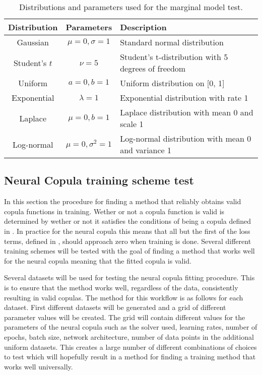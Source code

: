 \begin{table}[h]
    \centering
    \caption{Distributions and parameters used for the marginal model test.}
    \begin{tabular}{@{}ccl@{}}
        Distribution & Parameters & Description \\
        \toprule
        Gaussian & $\mu=0, \sigma=1$ & Standard normal distribution \\ 
        Student's $t$ & $\nu=5$ & Student's t-distribution with 5 degrees of freedom \\ 
        Uniform & $a=0, b=1$ & Uniform distribution on [0, 1] \\ 
        Exponential & $\lambda=1$ & Exponential distribution with rate 1 \\ 
        Laplace & $\mu=0, b=1$ & Laplace distribution with mean 0 and scale 1 \\ 
        Log-normal & $\mu=0, \sigma^2=1$ & Log-normal distribution with mean 0 and variance 1 \\ 
    \end{tabular}
    \label{tab:distributions}
\end{table}







\subsection{Neural Copula training scheme test}
In this section the procedure for finding a method that reliably obtains valid copula functions in training. Wether or not a copula function is valid is determined by wether or not it satisfies the conditions of being a copula defined in . In practice for the neural copula this means that all but the first of the loss terms, defined in , should approach zero when training is done. Several different training schemes will be tested with the goal of finding a method that works well for the neural copula meaning that the fitted copula is valid.

Several datasets will be used for testing the neural copula fitting procedure. This is to ensure that the method works well, regardless of the data, consistently resulting in valid copulas. The method for this workflow is as follows for each dataset. First different datasets will be generated  and a grid of different parameter values will be created. The grid will contain different values for the parameters of the neural copula such as the solver used, learning rates, number of epochs, batch size, network architecture, number of data points in the additional uniform datasets. This creates a large number of different combinations of choices to test which will hopefully result in a method for finding a training method that works well universally.  

